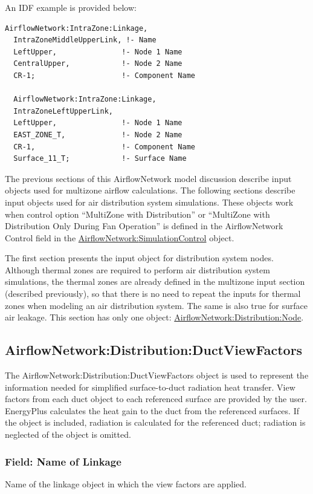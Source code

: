 An IDF example is provided below:

\begin{lstlisting}
AirflowNetwork:IntraZone:Linkage,
  IntraZoneMiddleUpperLink, !- Name
  LeftUpper,               !- Node 1 Name
  CentralUpper,            !- Node 2 Name
  CR-1;                    !- Component Name

  AirflowNetwork:IntraZone:Linkage,
  IntraZoneLeftUpperLink,
  LeftUpper,               !- Node 1 Name
  EAST_ZONE_T,             !- Node 2 Name
  CR-1,                    !- Component Name
  Surface_11_T;            !- Surface Name
\end{lstlisting}

The previous sections of this AirflowNetwork model discussion describe input objects used for multizone airflow calculations. The following sections describe input objects used for air distribution system simulations. These objects work when control option ``MultiZone with Distribution'' or ``MultiZone with Distribution Only During Fan Operation'' is defined in the AirflowNetwork Control field in the \hyperref[airflownetworksimulationcontrol]{AirflowNetwork:\hyperref[simulationcontrol]{SimulationControl}} object.

The first section presents the input object for distribution system nodes. Although thermal zones are required to perform air distribution system simulations, the thermal zones are already defined in the multizone input section (described previously), so that there is no need to repeat the inputs for thermal zones when modeling an air distribution system. The same is also true for surface air leakage. This section has only one object: \hyperref[airflownetworkdistributionnode]{AirflowNetwork:Distribution:Node}.

\subsection{AirflowNetwork:Distribution:DuctViewFactors}\label{airflownetworkdistributionductviewfactor}
The AirflowNetwork:Distribution:DuctViewFactors object is used to represent the information needed for simplified surface-to-duct radiation heat transfer. View factors from each duct object to each referenced surface are provided by the user. EnergyPlus calculates the heat gain to the duct from the referenced surfaces. If the object is included, radiation is calculated for the referenced duct; radiation is neglected of the object is omitted.

\subsubsection{Field: Name of Linkage}\label{field-name-of-linkage}
Name of the linkage object in which the view factors are applied.

